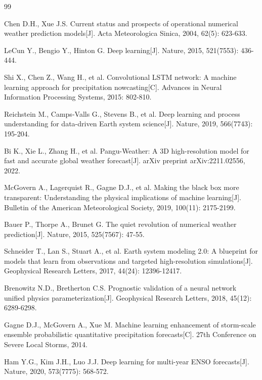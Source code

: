 \documentclass{article}
\begin{document}
\begin{thebibliography}{99}

Chen D.H., Xue J.S. Current status and prospects of operational numerical weather prediction models[J]. Acta Meteorologica Sinica, 2004, 62(5): 623-633.

LeCun Y., Bengio Y., Hinton G. Deep learning[J]. Nature, 2015, 521(7553): 436-444.

Shi X., Chen Z., Wang H., et al. Convolutional LSTM network: A machine learning approach for precipitation nowcasting[C]. Advances in Neural Information Processing Systems, 2015: 802-810.

Reichstein M., Camps-Valls G., Stevens B., et al. Deep learning and process understanding for data-driven Earth system science[J]. Nature, 2019, 566(7743): 195-204.

Bi K., Xie L., Zhang H., et al. Pangu-Weather: A 3D high-resolution model for fast and accurate global weather forecast[J]. arXiv preprint arXiv:2211.02556, 2022.

McGovern A., Lagerquist R., Gagne D.J., et al. Making the black box more transparent: Understanding the physical implications of machine learning[J]. Bulletin of the American Meteorological Society, 2019, 100(11): 2175-2199.

Bauer P., Thorpe A., Brunet G. The quiet revolution of numerical weather prediction[J]. Nature, 2015, 525(7567): 47-55.

Schneider T., Lan S., Stuart A., et al. Earth system modeling 2.0: A blueprint for models that learn from observations and targeted high-resolution simulations[J]. Geophysical Research Letters, 2017, 44(24): 12396-12417.

Brenowitz N.D., Bretherton C.S. Prognostic validation of a neural network unified physics parameterization[J]. Geophysical Research Letters, 2018, 45(12): 6289-6298.

Gagne D.J., McGovern A., Xue M. Machine learning enhancement of storm-scale ensemble probabilistic quantitative precipitation forecasts[C]. 27th Conference on Severe Local Storms, 2014.

Ham Y.G., Kim J.H., Luo J.J. Deep learning for multi-year ENSO forecasts[J]. Nature, 2020, 573(7775): 568-572.


\end{thebibliography}
\end{document}
